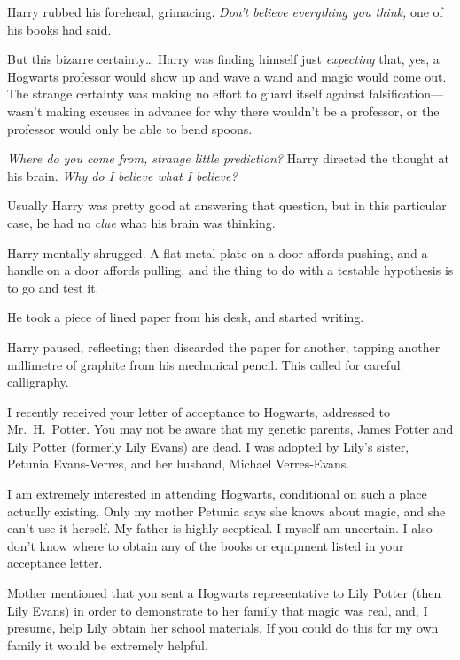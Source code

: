 Harry rubbed his forehead, grimacing. \emph{Don't believe everything you
think,} one of his books had said.

But this bizarre certainty{\ldots} Harry was finding himself just
\emph{expecting} that, yes, a Hogwarts professor would show up and wave a wand
and magic would come out. The strange certainty was making no effort to guard
itself against falsification---wasn't making excuses in advance for why there
wouldn't be a professor, or the professor would only be able to bend spoons.

\emph{Where do you come from, strange little prediction?} Harry directed the
thought at his brain. \emph{Why do I believe what I believe?}

Usually Harry was pretty good at answering that question, but in this
particular case, he had no \emph{clue} what his brain was thinking.

Harry mentally shrugged. A flat metal plate on a door affords pushing, and a
handle on a door affords pulling, and the thing to do with a testable
hypothesis is to go and test it.

He took a piece of lined paper from his desk, and started writing.

\begin{writtenNote}
\end{writtenNote}

Harry paused, reflecting; then discarded the paper for another, tapping another
millimetre of graphite from his mechanical pencil. This called for careful
calligraphy.

\begin{writtenNote}


I recently received your letter of acceptance to Hogwarts, addressed to
Mr.~H.~Potter. You may not be aware that my genetic parents, James Potter and
Lily Potter (formerly Lily Evans) are dead. I was adopted by Lily's sister,
Petunia Evans-Verres, and her husband, Michael Verres-Evans.

I am extremely interested in attending Hogwarts, conditional on such a
place actually existing. Only my mother Petunia says she knows about magic, and
she can't use it herself. My father is highly sceptical. I myself am uncertain.
I also don't know where to obtain any of the books or equipment listed in your
acceptance letter.

Mother mentioned that you sent a Hogwarts representative to Lily Potter
(then Lily Evans) in order to demonstrate to her family that magic was real,
and, I presume, help Lily obtain her school materials. If you could do this for
my own family it would be extremely helpful.

\end{writtenNote}

